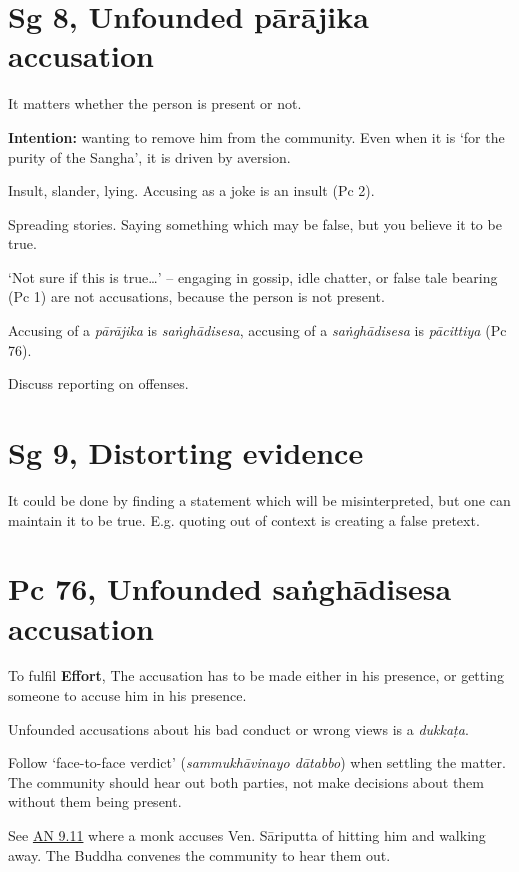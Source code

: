 \section{Sg 8, Unfounded pārājika accusation}

It matters whether the person is present or not.

\textbf{Intention:} wanting to remove him from the community. Even when
it is `for the purity of the Sangha', it is driven by aversion.

Insult, slander, lying. Accusing as a joke is an insult (Pc 2).

Spreading stories. Saying something which may be false, but you believe
it to be true.

\clearpage

`Not sure if this is true\ldots{}' -- engaging in gossip, idle chatter,
or false tale bearing (Pc 1) are not accusations, because the person is
not present.

Accusing of a \emph{pārājika} is \emph{saṅghādisesa}, accusing of a
\emph{saṅghādisesa} is \emph{pācittiya} (Pc 76).

Discuss reporting on offenses.

\section{Sg 9, Distorting evidence}

It could be done by finding a statement which will be misinterpreted,
but one can maintain it to be true. E.g. quoting out of context is
creating a false pretext.

\section{Pc 76, Unfounded saṅghādisesa accusation}

To fulfil \textbf{Effort}, The accusation has to be made either in his
presence, or getting someone to accuse him in his presence.

Unfounded accusations about his bad conduct or wrong views is a
\emph{dukkaṭa}.

Follow `face-to-face verdict' (\emph{sammukhāvinayo dātabbo}) when
settling the matter. The community should hear out both parties, not
make decisions about them without them being present.

See \href{https://suttacentral.net/an9.11/en/sujato}{AN 9.11} where a
monk accuses Ven. Sāriputta of hitting him and walking away. The Buddha
convenes the community to hear them out.

